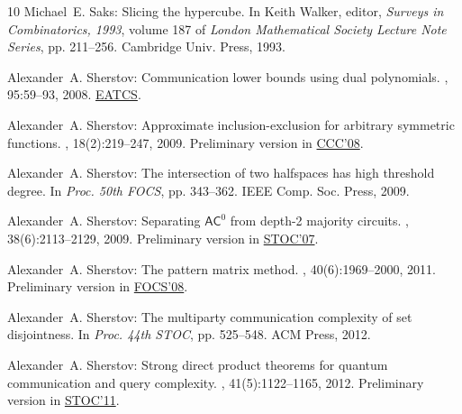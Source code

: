 \begin{thebibliography}{10}
{\sc Michael~E. Saks}: Slicing the hypercube.
\newblock In {\sc Keith Walker}, editor, {\em Surveys in Combinatorics, 1993},
  volume 187 of {\em London Mathematical Society Lecture Note Series}, pp.
  211--256. Cambridge Univ. Press, 1993.

{\sc Alexander~A. Sherstov}: Communication lower bounds using dual polynomials.
, 95:59--93, 2008.
\newblock \href{http://www.eatcs.org/images/bulletin/beatcs95.pdf}{EATCS}.

{\sc Alexander~A. Sherstov}: Approximate inclusion-exclusion for arbitrary
  symmetric functions.
, 18(2):219--247, 2009.
\newblock Preliminary version in
  \href{http://dx.doi.org/10.1109/CCC.2008.18}{CCC'08}.
\newblock [\epfmtdoi{10.1007/s00037-009-0274-4}]

{\sc Alexander~A. Sherstov}: The intersection of two halfspaces has high
  threshold degree.
\newblock In {\em Proc. 50th FOCS}, pp. 343--362. IEEE Comp. Soc. Press, 2009.

{\sc Alexander~A. Sherstov}: Separating {$\mathsf{AC}^0$} from depth-2 majority
  circuits.
, 38(6):2113--2129, 2009.
\newblock Preliminary version in
  \href{http://dx.doi.org/10.1145/1250790.1250834}{STOC'07}.
\newblock [\epfmtdoi{10.1137/08071421X}]

{\sc Alexander~A. Sherstov}: The pattern matrix method.
, 40(6):1969--2000, 2011.
\newblock Preliminary version in
  \href{http://dx.doi.org/10.1145/1374376.1374392}{FOCS'08}.
\newblock [\epfmtdoi{10.1137/080733644}]

{\sc Alexander~A. Sherstov}: The multiparty communication complexity of set
  disjointness.
\newblock In {\em Proc. 44th STOC}, pp. 525--548. ACM Press, 2012.
\newblock [\epfmtdoi{10.1145/2213977.2214026}]

{\sc Alexander~A. Sherstov}: Strong direct product theorems for quantum
  communication and query complexity.
, 41(5):1122--1165, 2012.
\newblock Preliminary version in
  \href{http://dx.doi.org/10.1145/1993636.1993643}{STOC'11}.
\newblock [\epfmtdoi{10.1137/110842661}]


\end{thebibliography}
